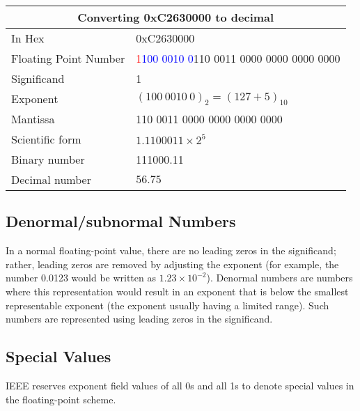 \documentclass[oneside]{book}
\begin{document}
\begin{table}[ht]
	\centering
	\begin{tabular}{|ll|}
		\hline
		\multicolumn{2}{|c|}{\textbf{Converting 0xC2630000 to decimal}}                                    \\
		\hline
		In Hex                & 0xC2630000                                                                 \\
		Floating Point Number & \textcolor{red}{1}\textcolor{blue}{100 0010 0}110 0011 0000 0000 0000 0000 \\
		\hline
		Significand           & 1                                                                          \\
		Exponent              & $(100\ 0010\ 0)_2 = (127 + 5)_{10}$                                        \\
		Mantissa              & 110 0011 0000 0000 0000 0000                                               \\
		\hline
		Scientific form       & $1.1100011\times 2^{5}$                                                    \\
		Binary number         & 111000.11                                                                  \\
		Decimal number        & $56.75$                                                                    \\
		\hline
	\end{tabular}
\end{table}

\subsection{Denormal/subnormal Numbers}
\label{denormal_number_section}
In a normal floating-point value, there are no leading zeros in the significand; rather, leading zeros are removed by adjusting the exponent (for example, the number 0.0123 would be written as \(1.23 \times 10^{-2}\)). Denormal numbers are numbers where this representation would result in an exponent that is below the smallest representable exponent (the exponent usually having a limited range). Such numbers are represented using leading zeros in the significand. \cite{ieee_745_denormal}

\subsection{Special Values}
IEEE reserves exponent field values of all 0s and all 1s to denote special values in the floating-point scheme. \cite{ieee_745_special_values}
\end{document}
